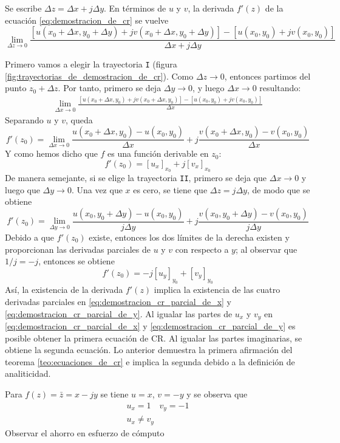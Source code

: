 Se escribe $\Delta z = \Delta x + j \Delta y$. En términos de $u$ y $v$, la derivada $f'(z)$ de la ecuación \ref{eq:demostracion_de_cr} se vuelve
\begin{equation*}
  \lim_{\Delta z \to 0} 
    \frac
      {\left[ 
        u(x_0+\Delta x, y_0+\Delta y) + jv(x_0+\Delta x, y_0 +\Delta y) 
      \right] - \left[
        u(x_0,y_0) + jv(x_0,y_0)
      \right]}
      {\Delta x + j\Delta y}
\end{equation*}

Primero vamos a elegir la trayectoria \texttt{I} (figura \ref{fig:trayectorias_de_demostracion_de_cr}). Como $\Delta z \to 0$, entonces partimos del punto $z_0+\Delta z$. Por tanto, primero se deja $\Delta y \to 0$, y luego $\Delta x \to 0$ resultando:
\begin{align*}
  \lim_{\Delta x \to 0}\frac{[u(x_0+\Delta x,y_0)+jv(x_0+\Delta x, y_0)]-[u(x_0,y_0)+jv(x_0,y_0)]}{\Delta x}
\end{align*}
Separando $u$ y $v$, queda
\begin{equation*}
  f'(z_0)=\lim_{\Delta x \to 0} \frac{u(x_0+\Delta x,y_0)-u(x_0,y_0)}{\Delta x} + j\frac{v(x_0+\Delta x,y_0)-v(x_0,y_0)}{\Delta x}
\end{equation*}
Y como hemos dicho que $f$ es una función derivable en $z_0$:
\begin{equation}\label{eq:demostracion_cr_parcial_de_x}
  \boxed{f'(z_0)=[u_x]_{x_0} + j[v_x]_{x_0}}
\end{equation}
De manera semejante, si se elige la trayectoria \texttt{II}, primero se deja que $\Delta x \to 0$ y luego que $\Delta y \to 0$. Una vez que $x$ es cero, se tiene que $\Delta z = j\Delta y$, de modo que se obtiene
\begin{equation*}
  f'(z_0) = \lim_{\Delta y \to 0}\frac{u(x_0,y_0+\Delta y)-u(x_0,y_0)}{j\Delta y} + j\frac{v(x_0,y_0+\Delta y)-v(x_0,y_0)}{j\Delta y}
\end{equation*}
Debido a que $f'(z_0)$ existe, entonces los dos límites de la derecha existen y proporcionan las derivadas parciales de $u$ y $v$ con respecto a $y$; al observar que $1/j=-j$, entonces se obtiene
\begin{equation}\label{eq:demostracion_cr_parcial_de_y}
  \boxed{f'(z_0) = -j[u_y]_{y_0} + [v_y]_{y_0}}
\end{equation}
Así, la existencia de la derivada $f'(z)$ implica la existencia de las cuatro derivadas parciales en \ref{eq:demostracion_cr_parcial_de_x} y \ref{eq:demostracion_cr_parcial_de_y}. Al igualar las partes de $u_x$ y $v_y$ en \ref{eq:demostracion_cr_parcial_de_x} y \ref{eq:demostracion_cr_parcial_de_y} es posible obtener la primera ecuación de CR. Al igualar las partes imaginarias, se obtiene la segunda ecuación. Lo anterior demuestra la primera afirmación del teorema \ref{teo:ecuaciones_de_cr} e implica la segunda debido a la definición de analiticidad.

\begin{example}
  Para $f(z)=\bar{z}=x-jy$ se tiene $u=x$, $v=-y$ y se observa que
  \begin{gather*}
    u_x=1 \quad v_y = -1 \\ 
    u_x \neq v_y
  \end{gather*}
  Observar el ahorro en esfuerzo de cómputo
\end{example}
